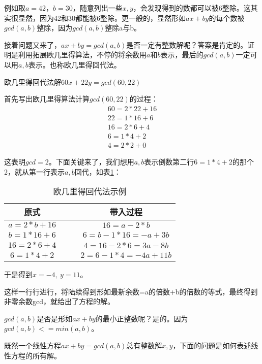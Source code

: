 例如取$a=42$，$b=30$，随意列出一些$x,y$，会发现得到的数都可以被6整除。这其实很显然，因为42和30都能被6整除。更一般的，{\heiti 显然形如$ax+by$的每个数被$gcd(a,b)$整除}，因为$gcd(a,b)$整除a与b。

接着问题又来了，$ax+by=gcd(a,b)$是否一定有整数解呢？答案是肯定的。证明是利用{\heiti 拓展欧几里得算法}，不停的将余数用$a$和$b$表示，{\heiti 最后的$gcd(a,b)$一定可以用$a,b$表示}。也称欧几里得回代法。

\begin{example}
欧几里得回代法解$60x+22y=gcd(60,22)$

首先写出欧几里得算法计算$gcd(60,22)$的过程：
\begin{align*}
60=2 * 22+16 \\
22=1 * 16+6 \\
16=2 * 6+4 \\
6=1 * 4+2 \\
4=2 * 2+0
\end{align*}

这表明$gcd=2$。下面关键来了，我们想用$a,b$表示倒数第二行$6=1*4+2$的那个2，就从第一行表示$a,b$回代，如表\ref{tab:欧几里得回代法示例}：

\begin{table}[!htbp]
	\centering
	\caption{欧几里得回代法示例}
	\begin{tabular}{cccc}
		\toprule
		原式  && & 带入过程  \\
		\midrule
		$a=2*b+16$&&  & $16=a-2*b$ \\
		$b=1*16+6$&& & $6=b-1*16=-a+3b$ \\
		$16=2*6+4$&& &  $4=16-2*6=3a-8b$ \\
		$6=1*4+2$ && & $2=6-1*4=-4a+11b$ \\
		\bottomrule
	\end{tabular}%
	\label{tab:欧几里得回代法示例}
\end{table}%
	
于是得到$x=-4, \ y=11$。

\end{example}

{\heiti 这样一行行进行，将陆续得到形如最新余数=a的倍数+b的倍数的等式，最终得到非零余数gcd，就给出了方程的解。}

\begin{note}
$gcd(a,b)$是否是形如$ax+by$的最小正整数呢？是的。因为$gcd(a,b)<=min(a,b)$。
\end{note}

\vbox{}

既然一个线性方程$ax+by=gcd(a,b)$总有整数解$x,y$，下面的问题是{\heiti 如何表述线性方程的所有解}。

